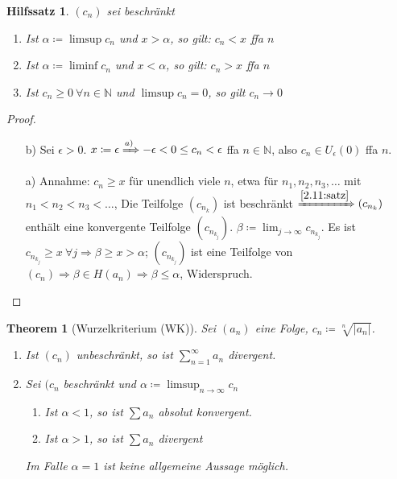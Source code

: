 \documentclass[14pt,titlepage,ngerman,a4paper,headsepline,DIV15,halfparskip*]{scrartcl}
\newcommand{\N}{\mathbb{N}}
\theoremstyle{named}
\newtheorem{namedtheorem}{Theorem} \counterwithin{namedtheorem}{section}
\theoremstyle{dotless}
\newtheorem*{hilfssatz*}{Hilfssatz}
\begin{document}
\begin{hilfssatz*}
	$(c_{n})$ sei beschränkt
	\begin{enumerate}
		\item Ist $\alpha \coloneqq \limsup c_{n}$ und $x > \alpha$, so gilt: $c_{n} < x$ ffa $n$
		\item Ist $\alpha \coloneqq \liminf c_{n}$ und $x < \alpha$, so gilt: $c_{n} > x$ ffa $n$
		\item Ist $c_{n} \geq 0 ~\forall n \in \N$ und $\limsup c_{n} = 0$, so gilt $c_{n} \rightarrow 0$
	\end{enumerate}
\end{hilfssatz*}

\begin{proof} ~\
	\begin{enumerate}
		\item[b)] Sei $\epsilon > 0$. $x \coloneqq \epsilon \xRightarrow[]{a)} -\epsilon < 0 \leq c_{n} < \epsilon$ ffa $n \in \N$, also $c_{n} \in U_{\epsilon}(0)$ ffa $n$.
		\item[a)] Annahme: $c_{n} \geq x$ für unendlich viele $n$, etwa für $n_{1}, n_{2}, n_{3}, \dotsc$ mit $n_{1} < n_{2} < n_{3} < \dotsc$, Die Teilfolge $(c_{n_{k}})$ ist beschränkt $\xRightarrow[]{\ref{2.11:satz}} (c_{n_{k}})$ enthält eine konvergente Teilfolge $(c_{n_{k_{j}}})$. $\beta \coloneqq \lim_{j\rightarrow \infty} c_{n_{k_{j}}}$. Es ist $c_{n_{k_{j}}} \geq x ~\forall j \Rightarrow \beta \geq x > \alpha$; $(c_{n_{k_{j}}})$ ist eine Teilfolge von $(c_{n}) \Rightarrow \beta \in H(a_{n}) \Rightarrow \beta \leq \alpha$, Widerspruch.
	\end{enumerate}	
\end{proof}

\begin{namedtheorem}[Wurzelkriterium (WK)] \label{3.6:prop-Wurzelkriterium}
	Sei $(a_{n})$ eine Folge, $c_{n} \coloneqq \sqrt[n]{|a_{n}|}$.
	\begin{enumerate}
		\item Ist $(c_{n})$ unbeschränkt, so ist $\sum_{n=1}^{\infty} a_{n}$ divergent.
		\item Sei $(c_{n}$ beschränkt und $\alpha \coloneqq \limsup_{n \rightarrow \infty} c_{n}$
			\begin{enumerate}
				\item Ist $\alpha < 1$, so ist $\sum a_{n}$ absolut konvergent.
				\item Ist $\alpha > 1$, so ist $\sum a_{n}$ divergent
			\end{enumerate}
			Im Falle $\alpha = 1$ ist keine allgemeine Aussage möglich.
	\end{enumerate}
\end{namedtheorem}
\end{document}
